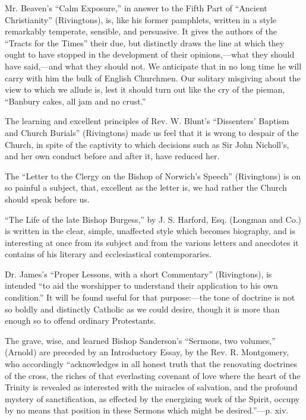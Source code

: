 Mr. Beaven's ``Calm Exposure,'' in answer to the
Fifth Part of ``Ancient Christianity'' (Rivingtons), is, like his former
pamphlets, written in a style remarkably temperate, sensible, and
persuasive. It gives the authors of the ``Tracts for the Times'' their
due, but distinctly draws the line at which they ought to have stopped
in the development of their opinions,—what they should have
said,—and what they should not. We anticipate that in no long time he
will carry with him the bulk of English Churchmen. Our solitary
misgiving about the view to which we allude is, lest it should turn out
like the cry of the pieman, ``Banbury cakes, all jam and no crust.''

The learning and excellent principles of Rev. W.
Blunt's ``Dissenters' Baptism and Church Burials'' (Rivingtons) made
us feel that it is wrong to despair of the Church, in spite of the
captivity to which decisions such as Sir John Nicholl's, and her own
conduct before and after it, have reduced her.

The ``Letter to the Clergy on the Bishop of Norwich's
Speech'' (Rivingtons) is on so painful a subject, that, excellent as the
letter is, we had rather the Church should speak before us.

``The Life of the late Bishop Burgess,'' by J. S.
Harford, Esq. (Longman and Co.) is written in the clear, simple,
unaffected style which becomes biography, and is interesting at once
from its subject and from the various letters and anecdotes it contains
of his literary and ecclesiastical contemporaries.

Dr. James's ``Proper Lessons, with a short
Commentary'' (Rivingtons), is intended ``to aid the worshipper to
understand their application to his own condition.'' It will be found
useful for that purpose:—the tone of doctrine is not so boldly and
distinctly Catholic as we could desire, though it is more than enough so
to offend ordinary Protestants.

The grave, wise, and learned Bishop Sanderson's ``Sermons,
two volumes,'' (Arnold) are preceded by an Introductory Essay, by the
Rev. R. Montgomery, who accordingly ``acknowledges in all honest truth
that the renovating doctrines of the cross, the riches of that
everlasting covenant of love where the heart of the Trinity is revealed
as interested with the miracles of salvation, and the profound mystery
of sanctification, as effected by the energizing work of the Spirit,
occupy by no means that position in these Sermons which might be
desired.''—p. xiv.

